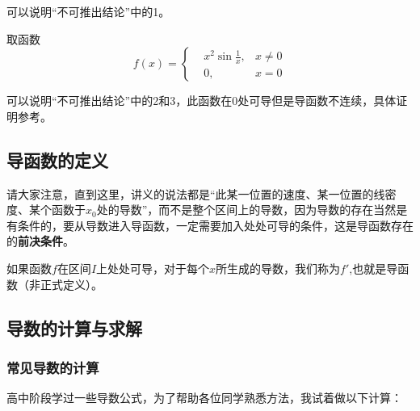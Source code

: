 可以说明“不可推出结论”中的1。

取函数
$$ f(x)=\left\{
\begin{aligned}
	&x^2 \sin\frac{1}{x},&x\neq 0\\
	&0,&x=0
\end{aligned}
\right.
$$

可以说明“不可推出结论”中的2和3，此函数在0处可导但是导函数不连续，具体证明参考\textcolor{lbexacolor}{}。

\subsection{导函数的定义}\label{sec:1.1.3}

请大家注意，直到这里，讲义的说法都是“此某一位置的速度、某一位置的线密度、某个函数于$x_0$处的导数”，而不是整个区间上的导数，因为导数的存在当然是有条件的，要从导数进入导函数，一定需要加入处处可导的条件，这是导函数存在的\textbf{前决条件}。

\begin{definition}
	如果函数$f$在区间$I$上处处可导，对于每个$x$所生成的导数，我们称为$f'$,也就是导函数（非正式定义）。
\end{definition}

\subsection{导数的计算与求解}\label{sec:1.1.4}

\subsubsection{常见导数的计算}\label{sec:1.1.4.1}

高中阶段学过一些导数公式，为了帮助各位同学熟悉方法，我试着做以下计算：

